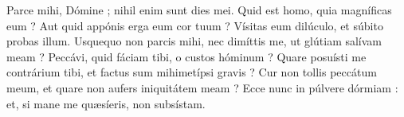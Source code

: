 
Parce mihi, Dómine ; nihil enim sunt dies mei.
Quid est homo, quia magníficas eum ? Aut quid appónis erga eum cor tuum ?
Vísitas eum dilúculo, et súbito probas illum.
Usquequo non parcis mihi, nec dimíttis me, ut glútiam salívam meam ?
Peccávi, quid fáciam tibi, o custos hóminum ? Quare posuísti me contrárium tibi, et factus sum mihimetípsi gravis ?
Cur non tollis peccátum meum, et quare non aufers iniquitátem meam ? Ecce nunc in púlvere dórmiam : et, si mane me quæsíeris, non subsístam.